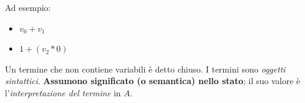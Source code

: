 \noindent Ad esempio:
\begin{itemize}
    \item $v_0 + v_1$
    \item $1 + (v_2 * 0)$
\end{itemize}

\noindent Un termine che non contiene variabili è detto chiuso. I termini 
sono \textit{oggetti sintattici}. \textbf{Assumono significato (o semantica)
nello stato}; il suo valore è l'\textit{interpretazione del termine} in $A$.


